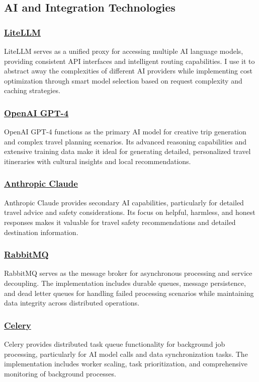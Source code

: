 \subsection{AI and Integration Technologies}

\subsubsection*{\underline{LiteLLM}}
LiteLLM serves as a unified proxy for accessing multiple AI language models, providing consistent API interfaces and intelligent routing capabilities. I use it to abstract away the complexities of different AI providers while implementing cost optimization through smart model selection based on request complexity and caching strategies.

\subsubsection*{\underline{OpenAI GPT-4}}
OpenAI GPT-4 functions as the primary AI model for creative trip generation and complex travel planning scenarios. Its advanced reasoning capabilities and extensive training data make it ideal for generating detailed, personalized travel itineraries with cultural insights and local recommendations.

\subsubsection*{\underline{Anthropic Claude}}
Anthropic Claude provides secondary AI capabilities, particularly for detailed travel advice and safety considerations. Its focus on helpful, harmless, and honest responses makes it valuable for travel safety recommendations and detailed destination information.

\subsubsection*{\underline{RabbitMQ}}
RabbitMQ serves as the message broker for asynchronous processing and service decoupling. The implementation includes durable queues, message persistence, and dead letter queues for handling failed processing scenarios while maintaining data integrity across distributed operations.

\subsubsection*{\underline{Celery}}
Celery provides distributed task queue functionality for background job processing, particularly for AI model calls and data synchronization tasks. The implementation includes worker scaling, task prioritization, and comprehensive monitoring of background processes.

